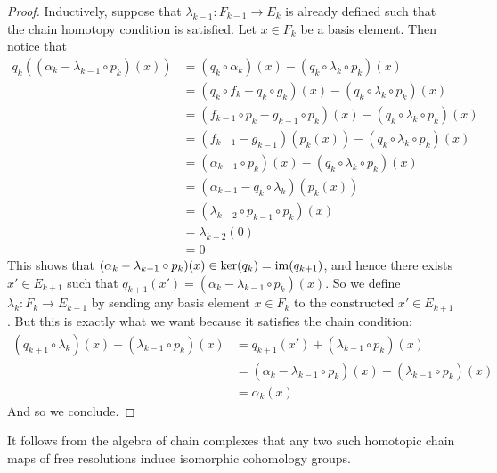 \documentclass[a4paper]{article}
\begin{document}
\begin{prp}{}{}
\begin{proof}
Inductively, suppose that $\lambda_{k-1}:F_{k-1}\to E_k$ is already defined such that the chain homotopy condition is satisfied. Let $x\in F_k$ be a basis element. Then notice that 
\begin{align*}
q_k((\alpha_k-\lambda_{k-1}\circ p_k)(x))&=(q_k\circ\alpha_k)(x)-(q_k\circ\lambda_k\circ p_k)(x)\\
&=(q_k\circ f_k-q_k\circ g_k)(x)-(q_k\circ\lambda_k\circ p_k)(x)\\
&=(f_{k-1}\circ p_k-g_{k-1}\circ p_k)(x)-(q_k\circ\lambda_k\circ p_k)(x)\\
&=(f_{k-1}-g_{k-1})(p_k(x))-(q_k\circ\lambda_k\circ p_k)(x)\\
&=(\alpha_{k-1}\circ p_k)(x)-(q_k\circ\lambda_k\circ p_k)(x)\\
&=(\alpha_{k-1}-q_k\circ\lambda_k)(p_k(x))\\
&=(\lambda_{k-2}\circ p_{k-1}\circ p_k)(x)\tag{Chain Homotopy Condition}\\
&=\lambda_{k-2}(0)\\
&=0
\end{align*}
This shows that $(\alpha_k-\lambda_{k-1}\circ p_k)(x)\in\ker(q_k)=\operatorname{im}(q_{k+1})$, and hence there exists $x'\in E_{k+1}$ such that $q_{k+1}(x')=(\alpha_k-\lambda_{k-1}\circ p_k)(x)$. So we define $\lambda_k:F_k\to E_{k+1}$ by sending any basis element $x\in F_k$ to the constructed $x'\in E_{k+1}$. But this is exactly what we want because it satisfies the chain condition: 
\begin{align*}
(q_{k+1}\circ\lambda_k)(x)+(\lambda_{k-1}\circ p_k)(x)&=q_{k+1}(x')+(\lambda_{k-1}\circ p_k)(x)\\
&=(\alpha_k-\lambda_{k-1}\circ p_k)(x)+(\lambda_{k-1}\circ p_k)(x)\\
&=\alpha_k(x)
\end{align*}
And so we conclude. 
\end{proof}
\end{prp}

It follows from the algebra of chain complexes that any two such homotopic chain maps of free resolutions induce isomorphic cohomology groups. 
\end{document}
